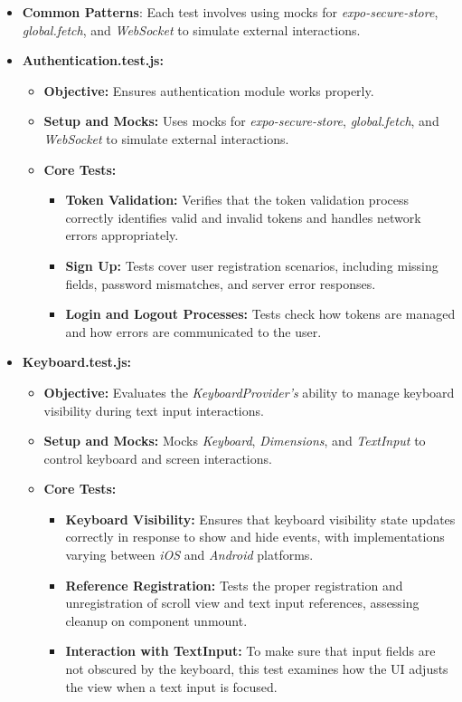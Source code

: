\begin{itemize}
    \item \textbf{Common Patterns}: Each test involves using mocks for \textit{expo-secure-store}, \textit{global.fetch}, and \textit{WebSocket} to simulate external interactions.

    \item \textbf{Authentication.test.js:}
    \begin{itemize}
        \item \textbf{Objective:} Ensures authentication module works properly.
        \item \textbf{Setup and Mocks:} Uses mocks for \textit{expo-secure-store}, \textit{global.fetch}, and \textit{WebSocket} to simulate external interactions.
        \item \textbf{Core Tests:}
        \begin{itemize}
            \item \textbf{Token Validation:} Verifies that the token validation process correctly identifies valid and invalid tokens and handles network errors appropriately.
            \item \textbf{Sign Up:} Tests cover user registration scenarios, including missing fields, password mismatches, and server error responses.
            \item \textbf{Login and Logout Processes:} Tests check how tokens are managed and how errors are communicated to the user.
        \end{itemize}
    \end{itemize}

    \item \textbf{Keyboard.test.js:}
    \begin{itemize}
        \item \textbf{Objective:} Evaluates the \textit{KeyboardProvider's} ability to manage keyboard visibility during text input interactions.
        \item \textbf{Setup and Mocks:} Mocks \textit{Keyboard}, \textit{Dimensions}, and \textit{TextInput} to control keyboard and screen interactions.
        \item \textbf{Core Tests:}
        \begin{itemize}
            \item \textbf{Keyboard Visibility:} Ensures that keyboard visibility state updates correctly in response to show and hide events, with implementations varying between \textit{iOS} and \textit{Android} platforms.
            \item \textbf{Reference Registration:} Tests the proper registration and unregistration of scroll view and text input references, assessing cleanup on component unmount.
            \item \textbf{Interaction with TextInput:} To make sure that input fields are not obscured by the keyboard, this test examines how the UI adjusts the view when a text input is focused.
        \end{itemize}
    \end{itemize}


\end{itemize}
